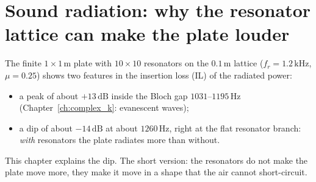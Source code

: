 
\chapter{Sound radiation: why the resonator lattice can make the plate louder}
\label{ch:radiation}

The finite $1 \times 1\,\mathrm{m}$ plate with $10 \times 10$ resonators on the
$0.1\,\mathrm{m}$ lattice ($f_r = 1.2\,\mathrm{kHz}$, $\mu = 0.25$) shows two
features in the insertion loss (IL) of the radiated power:
\begin{itemize}
  \item a peak of about $+13\,\mathrm{dB}$ inside the Bloch gap
        $1031$--$1195\,\mathrm{Hz}$ (Chapter~\ref{ch:complex_k}: evanescent
        waves);
  \item a dip of about $-14\,\mathrm{dB}$ at about $1260\,\mathrm{Hz}$, right at
        the flat resonator branch: \emph{with} resonators the plate radiates more
        than without.
\end{itemize}
This chapter explains the dip. The short version: the resonators do not make the
plate move more, they make it move in a shape that the air cannot short-circuit.

